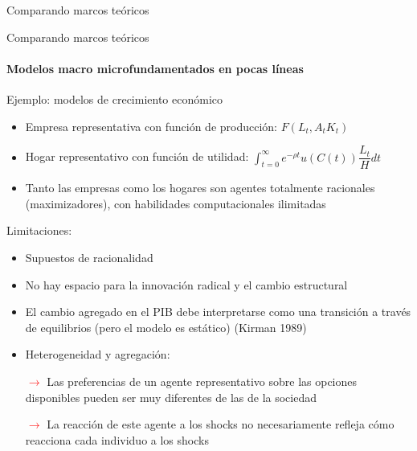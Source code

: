 \documentclass[11pt]{beamer}
\begin{document}
\begin{frame}
\begin{frame}{Comparando marcos teóricos}
\end{frame}


\begin{frame}{Comparando marcos teóricos}
\framesubtitle{Modelos macro microfundamentados en pocas líneas}
\begin{multicols}{2}
Ejemplo: modelos de crecimiento económico
\begin{itemize}
\footnotesize    \item Empresa representativa con función de producción: $F(L_t , A_t K_t )$
\item Hogar representativo con función de utilidad: $\int_{t=0}^\infty e^{-\rho t} u(C(t)) \dfrac{L_t}{H} dt$
\item Tanto las empresas como los hogares son agentes totalmente racionales (maximizadores), con habilidades computacionales ilimitadas
\end{itemize}
Limitaciones:
\begin{itemize}
    \footnotesize \item Supuestos de racionalidad
\item No hay espacio para la innovación radical y el cambio estructural
\item El cambio agregado en el PIB debe interpretarse como una transición a través de equilibrios (pero el modelo es estático) (Kirman 1989)
\item Heterogeneidad y agregación:
\item[\textcolor{red}{$\rightarrow$}] Las preferencias de un agente representativo sobre las opciones disponibles pueden ser muy diferentes de las de la sociedad
\item[\textcolor{red}{$\rightarrow$}] La reacción de este agente a los shocks no necesariamente refleja cómo reacciona cada individuo a los shocks
\end{itemize}
\end{multicols}
\end{frame}



\end{frame}
\end{document}
